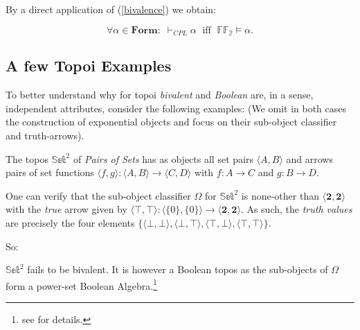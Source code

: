 	By a direct application of (\ref{bivalence}) we obtain:
	\begin{cor}
		\begin{equation*}
			\forall \alpha \in \textbf{Form} : \;\vdash_{CPL} \alpha \;\text{ iff }\; \mathbb{FF_2} \models \alpha.
		\end{equation*}
	\end{cor}

\newpage	
\subsection{A few Topoi Examples}
\label{examples}
	
	To better understand why for topoi \emph{bivalent} and \emph{Boolean} are, in a sense, independent attributes, consider the following examples:\newline
	(We omit in both cases the construction of exponential objects and focus on their sub-object classifier and truth-arrows).
	
	\begin{ex}
		The topos $ \mathbb{Set}^2 $ of \emph{Pairs of Sets} has as objects all set pairs $\langle A,B \rangle$ and arrows pairs of set functions $\langle f, g \rangle :  \langle A,B \rangle \rightarrow \langle C,D \rangle$ with $f: A \rightarrow C$ and $g: B \rightarrow D$.\newline
		
		One can verify that the sub-object classifier $\Omega$ for $ \mathbb{Set}^2 $ is none-other than 
		$\langle \textbf{2}, \textbf{2} \rangle $ with the \emph{true} arrow given by $\langle \top,\top \rangle : \langle \{0\},\{0\} \rangle \rightarrow \langle \textbf{2}, \textbf{2} \rangle $.\newline
		As such, the \emph{truth values} are precisely the four elements $\{ \langle \bot,\bot \rangle, \langle \bot,\top \rangle, \langle \top,\bot \rangle, \langle \top,\top \rangle \}$. 
	\end{ex} 
	So:
	\begin{remark}
		$ \mathbb{Set}^2 $ fails to be bivalent. It is however a Boolean topos as the sub-objects of $\Omega$ form a power-set Boolean Algebra.\footnote{see \cite{goldblatt} for details.}  
	\end{remark}
	

